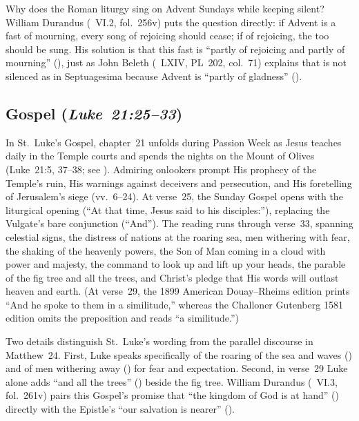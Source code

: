 Why does the Roman liturgy sing  on Advent Sundays while keeping  silent? William Durandus (~VI.2, fol.~256v) puts the question directly: if Advent is a fast of mourning, every song of rejoicing should cease; if of rejoicing, the  too should be sung. His solution is that this fast is ``partly of rejoicing and partly of mourning'' (), just as John Beleth (~LXIV, PL~202, col.~71) explains that  is not silenced as in Septuagesima because Advent is ``partly of gladness'' ().

\subsection{Gospel (\textit{Luke~21:25--33})}

In St.~Luke's Gospel, chapter~21 unfolds during Passion Week as Jesus teaches daily in the Temple courts and spends the nights on the Mount of Olives (Luke~21:5, 37--38; see \hyperref[sec:date-location]{}). Admiring onlookers prompt His prophecy of the Temple's ruin, His warnings against deceivers and persecution, and His foretelling of Jerusalem's siege (vv.~6--24). At verse~25, the Sunday Gospel opens with the liturgical opening  (``At that time, Jesus said to his disciples:''), replacing the Vulgate's bare conjunction  (``And''). The reading runs through verse~33, spanning celestial signs, the distress of nations at the roaring sea, men withering with fear, the shaking of the heavenly powers, the Son of Man coming in a cloud with power and majesty, the command to look up and lift up your heads, the parable of the fig tree and all the trees, and Christ's pledge that His words will outlast heaven and earth. (At verse~29, the 1899 American Douay--Rheims edition prints ``And he spoke to them in a similitude,'' whereas the Challoner Gutenberg 1581 edition omits the preposition and reads ``a similitude.'')

Two details distinguish St.~Luke's wording from the parallel discourse in Matthew~24. First, Luke speaks specifically of the roaring of the sea and waves () and of men withering away () for fear and expectation. Second, in verse~29 Luke alone adds ``and all the trees'' () beside the fig tree. William Durandus (~VI.3, fol.~261v) pairs this Gospel's promise that ``the kingdom of God is at hand'' () directly with the Epistle's ``our salvation is nearer'' ().


